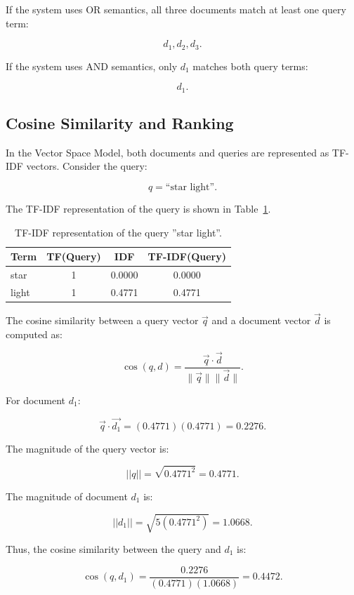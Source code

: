 If the system uses OR semantics, all three documents match at least one query
term:

\[
d_1, d_2, d_3.
\]

If the system uses AND semantics, only $d_1$ matches both query terms:

\[
d_1.
\]

\subsection{Cosine Similarity and Ranking}

In the Vector Space Model, both documents and queries are represented as
TF-IDF vectors. Consider the query:

\[
q = \text{``star light''}.
\]

The TF-IDF representation of the query is shown in
Table~\ref{tab:query_tfidf}.

\begin{table}[h]
\centering
\caption{TF-IDF representation of the query ''star light''.}
\label{tab:query_tfidf}
\begin{tabular}{|l|c|c|c|}
\hline
\textbf{Term} & \textbf{TF(Query)} & \textbf{IDF} & \textbf{TF-IDF(Query)} \\ 
\hline
star & 1 & 0.0000 & 0.0000 \\ 
\hline
light & 1 & 0.4771 & 0.4771 \\ 
\hline
\end{tabular}
\end{table}

The cosine similarity between a query vector $\vec{q}$ and a document vector
$\vec{d}$ is computed as:

\begin{equation}
\cos(q,d)=
\frac{\vec{q}\cdot\vec{d}}
{\|\vec{q}\|\|\vec{d}\|}.
\end{equation}

For document $d_1$:

\[
\vec{q}\cdot\vec{d_1}
=
(0.4771)(0.4771)
=
0.2276.
\]

The magnitude of the query vector is:

\[
||q||=\sqrt{0.4771^2}=0.4771.
\]

The magnitude of document $d_1$ is:

\[
||d_1||
=
\sqrt{
5(0.4771^2)
}
=
1.0668.
\]

Thus, the cosine similarity between the query and $d_1$ is:

\[
\cos(q,d_1)
=
\frac{0.2276}
{(0.4771)(1.0668)}
=
0.4472.
\]

